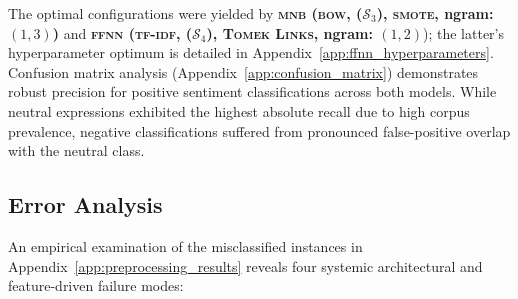 \documentclass[manuscript,screen,review, nonacm]{acmart}
\begin{document}
The optimal configurations were yielded by \textbf{\textsc{mnb} (\textsc{bow}, ($\mathcal{S}_3$), \textsc{smote}, ngram: $(1, 3)$)} and \textbf{\textsc{ffnn} (\textsc{tf-idf},  ($\mathcal{S}_4$), \textsc{Tomek Links}, ngram: $(1, 2)$}); the latter's hyperparameter optimum is detailed in Appendix~\ref{app:ffnn_hyperparameters}. Confusion matrix analysis (Appendix~\ref{app:confusion_matrix}) demonstrates robust precision for positive sentiment classifications across both models. While neutral expressions exhibited the highest absolute recall due to high corpus prevalence, negative classifications suffered from pronounced false-positive overlap with the neutral class.

\subsection{Error Analysis}
An empirical examination of the misclassified instances in Appendix~\ref{app:preprocessing_results} reveals four systemic architectural and feature-driven failure modes:
\end{document}
